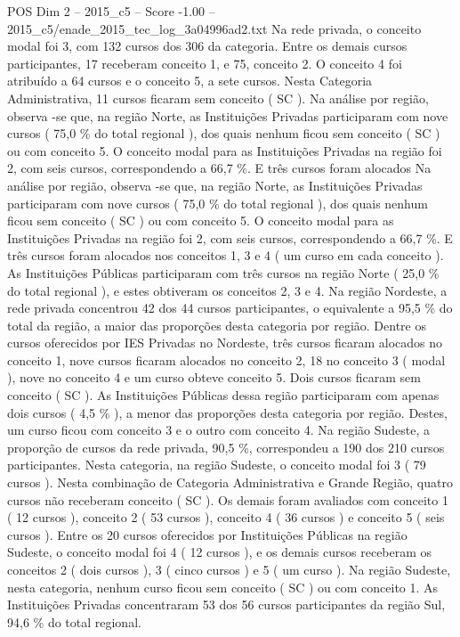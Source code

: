 \begin{textsample}{POS Dim 2 – 2015\_c5 – Score -1.00 – 2015\_c5/enade\_2015\_tec\_log\_3a04996ad2.txt}
Na rede privada, o conceito modal foi 3, com 132 cursos dos 306 da categoria.
Entre os demais cursos participantes, 17 receberam conceito 1, e 75, conceito 2.
O conceito 4 foi atribuído a 64 cursos e o conceito 5, a sete cursos.
Nesta Categoria Administrativa, 11 cursos ficaram sem conceito ( SC ).
Na análise por região, observa -se que, na região Norte, as Instituições Privadas participaram com nove cursos ( 75,0 \% do total regional ), dos quais nenhum ficou sem conceito ( SC ) ou com conceito 5.
O conceito modal para as Instituições Privadas na região foi 2, com seis cursos, correspondendo a 66,7 \%.
E três cursos foram alocados Na análise por região, observa -se que, na região Norte, as Instituições Privadas participaram com nove cursos ( 75,0 \% do total regional ), dos quais nenhum ficou sem conceito ( SC ) ou com conceito 5.
O conceito modal para as Instituições Privadas na região foi 2, com seis cursos, correspondendo a 66,7 \%.
E três cursos foram alocados nos conceitos 1, 3 e 4 ( um curso em cada conceito ).
As Instituições Públicas participaram com três cursos na região Norte ( 25,0 \% do total regional ), e estes obtiveram os conceitos 2, 3 e 4.
Na região Nordeste, a rede privada concentrou 42 dos 44 cursos participantes, o equivalente a 95,5 \% do total da região, a maior das proporções desta categoria por região.
Dentre os cursos oferecidos por IES Privadas no Nordeste, três cursos ficaram alocados no conceito 1, nove cursos ficaram alocados no conceito 2, 18 no conceito 3 ( modal ), nove no conceito 4 e um curso obteve conceito 5.
Dois cursos ficaram sem conceito ( SC ).
As Instituições Públicas dessa região participaram com apenas dois cursos ( 4,5 \% ), a menor das proporções desta categoria por região.
Destes, um curso ficou com conceito 3 e o outro com conceito 4.
Na região Sudeste, a proporção de cursos da rede privada, 90,5 \%, correspondeu a 190 dos 210 cursos participantes.
Nesta categoria, na região Sudeste, o conceito modal foi 3 ( 79 cursos ).
Nesta combinação de Categoria Administrativa e Grande Região, quatro cursos não receberam conceito ( SC ).
Os demais foram avaliados com conceito 1 ( 12 cursos ), conceito 2 ( 53 cursos ), conceito 4 ( 36 cursos ) e conceito 5 ( seis cursos ).
Entre os 20 cursos oferecidos por Instituições Públicas na região Sudeste, o conceito modal foi 4 ( 12 cursos ), e os demais cursos receberam os conceitos 2 ( dois cursos ), 3 ( cinco cursos ) e 5 ( um curso ).
Na região Sudeste, nesta categoria, nenhum curso ficou sem conceito ( SC ) ou com conceito 1.
As Instituições Privadas concentraram 53 dos 56 cursos participantes da região Sul, 94,6 \% do total regional.

\end{textsample}
